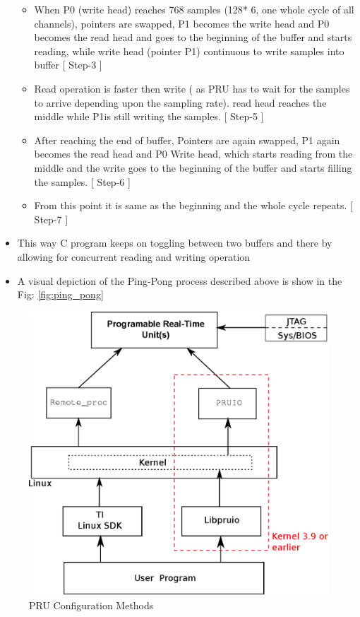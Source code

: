 \begin{itemize}
\begin{itemize}
		
		\item When P0 (write head) reaches 768 samples (128* 6, one whole cycle of all channels), pointers are swapped, P1 becomes the write head and P0 becomes the read head and goes to the beginning of the buffer and starts reading, while write head (pointer P1) continuous to write samples into buffer [ Step-3 ]
		\item Read operation is faster then write ( as PRU has to wait for the samples to arrive depending upon the sampling rate). read head reaches the middle while P1is still writing the samples. [ Step-5 ]
		\item After reaching the end of buffer, Pointers are again swapped, P1 again becomes the read head and P0 Write head, which starts reading from the middle and the write goes to the beginning of the buffer and starts filling the samples. [ Step-6 ]
		\item From this point it is same as the beginning and the whole cycle repeats. [ Step-7 ]
	\end{itemize} 
	\item This way C program keeps on toggling between two buffers and there by allowing for concurrent reading and writing operation
	\item A visual depiction of the Ping-Pong process described above is show in the Fig: \ref{fig:ping_pong}
\end{itemize}

\begin{figure}[h]
	\includegraphics[width=\textwidth]{fig/PRU_config.eps}
	\caption{PRU Configuration Methods}
	\label{fig:pru_config}
\end{figure}


